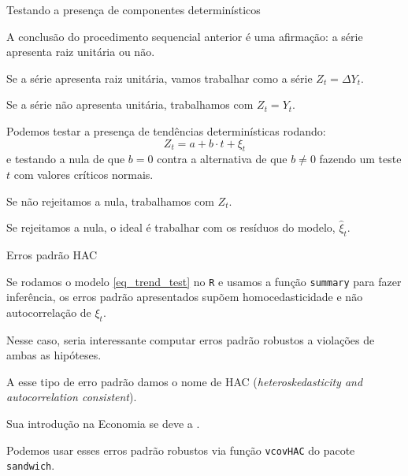 \documentclass[11pt]{beamer}
\newenvironment{halfwideitemize}{\itemize\addtolength{\itemsep}{0.5em}}{\enditemize}
\begin{document}
\begin{frame}{Testando a presença de componentes determinísticos}
	\begin{halfwideitemize}
		\item A conclusão do procedimento sequencial anterior é uma afirmação: a série apresenta raiz unitária ou não.
		\item Se a série apresenta raiz unitária, vamos trabalhar como a série $Z_t = \Delta Y_t$.
		\item Se a série não apresenta unitária, trabalhamos com $Z_t = Y_t$.
		\item Podemos testar a presença de tendências determinísticas rodando:
		\begin{equation}
			\label{eq_trend_test}
			Z_t = a + b \cdot t + \xi_t
		\end{equation}
		e testando a nula de que $b=0$ contra a alternativa de que $b \neq 0$ fazendo um teste $t$ com valores críticos normais.
		\begin{halfwideitemize}
			\item Se não rejeitamos a nula, trabalhamos com $Z_t$.
			\item Se rejeitamos a nula, o ideal é trabalhar com os resíduos do modelo, $\hat{\xi}_t$.
		\end{halfwideitemize}
	\end{halfwideitemize}
\end{frame}

\begin{frame}{Erros padrão HAC}
	\begin{halfwideitemize}
		\item Se rodamos o modelo \eqref{eq_trend_test} no \texttt{R} e usamos a função \texttt{summary} para fazer inferência, os erros padrão apresentados supõem homocedasticidade e não autocorrelação de $\xi_t$.
		\item Nesse caso, seria interessante computar erros padrão robustos a violações de ambas as hipóteses.
		\begin{halfwideitemize}
			\item A esse tipo de erro padrão damos o nome de HAC (\textit{heteroskedasticity and autocorrelation consistent}).
			\item Sua introdução na Economia se deve a \citet{Newey1987}.
		\end{halfwideitemize}
		\item Podemos usar esses erros padrão robustos via função \texttt{vcovHAC} do pacote \texttt{sandwich}.
	\end{halfwideitemize}
\end{frame}
\end{document}
